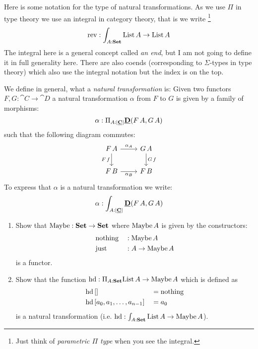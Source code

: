 Here is some notation for the type of natural transformations. As we use $\Pi$ in type theory we use an integral in category theory, that is we write
\footnote{Just think of \emph{parametric $\Pi$ type} when you see the integral.}
\[ \mathrm{rev} : \int_{A:\mathbf{Set}} \mathrm{List}\,A \to \mathrm{List}\,A \]
The integral here is a general concept called \emph{an end}, but I am not going to define it in full generality here. There are also coends (corresponding to $\Sigma$-types in type theory) which also use the integral notation but the index is on the top.

We define in general, what a \emph{natural transformation} is: Given two functors $F,G : \cat{C} \to \cat{D}$ a natural transformation $\alpha$ from $F$ to $G$ is given by a family of morphisms: 
\[\alpha : \Pi_{A : |\underline{\mathbf{C}}|} \underline{\mathbf{D}}(F\,A,G\,A)\]
such that the following diagram commutes:
\[\begin{tikzcd}
F\,A \arrow[r,"\alpha_A"] \arrow[d,"F\,f" left] & G\,A \arrow[d,"G\,f"]\\
F\,B \arrow[r,"\alpha_B" below] & F\,B
\end{tikzcd}
\]
To express that $\alpha$ is a natural transformation we write:
\[ \alpha : \int_{A : |\underline{\mathbf{C}}|} \underline{\mathbf{D}}(F\,A,G\,A)\]

\begin{Exercise}\hfill

  \begin{enumerate}
  \item 
    Show that $\mathrm{Maybe} : \mathbf{Set} \to \mathbf{Set}$ where $\mathrm{Maybe}\,A$ is given by the constructors:
    \begin{align*}
      &\mathrm{nothing} && : \mathrm{Maybe}\,A \\
      &\mathrm{just} && : A \to \mathrm{Maybe}\,A
    \end{align*}
   is a functor.
  \item Show that the function $\mathrm{hd} : \Pi_{A:\mathbf{Set}}\mathrm{List}\,A \to \mathrm{Maybe}\,A$ which is defined as
    \begin{align*}
      &\mathrm{hd}\,[] && = \mathrm{nothing} \\
      &\mathrm{hd}\,  [a_0,a_1,\dots,a_{n-1}]  && = a_0
    \end{align*}
    is a natural transformation (i.e. $\mathrm{hd} : \int_{A:\mathbf{Set}}\mathrm{List}\,A \to \mathrm{Maybe}\,A$).
  \end{enumerate}
\end{Exercise}

